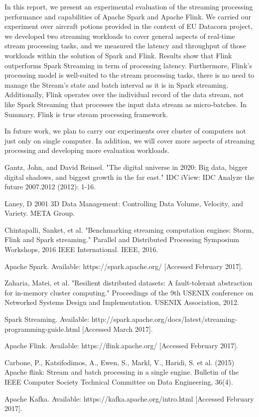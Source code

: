 \documentclass[]{article}
\begin{document}
In this report, we present an experimental evaluation of the streaming processing performance and capabilities of Apache Spark and Apache Flink. We carried our experiment over aircraft potions provided in the context of EU Datacorn  project, we developed two streaming workloads to cover general aspects of real-time stream processing tasks, and we measured the latency and throughput of those workloads within the solution of Spark and Flink. Results show that Flink outperforms Spark Streaming in term of processing latency. Furthermore, Flink's processing model is well-suited to  the stream processing tasks, there is no need to manage the Stream's state and batch interval as it is in Spark streaming. Additionally, Flink operates over the individual record of the data stream, not like Spark Streaming that processes the input data stream as micro-batches. In Summary, Flink is true stream processing framework.

In future work, we plan to carry our experiments over cluster of computers not just only on single computer. In addition, we will cover more aspects of streaming processing and developing more evaluation workloads. 




\begin{thebibliography}{[MT1]}
%
Gantz, John, and David Reinsel. "The digital universe in 2020: Big data, bigger digital shadows, and biggest growth in the far east." IDC iView: IDC Analyze the future 2007.2012 (2012): 1-16.

Laney, D 2001 3D Data Management: Controlling Data Volume, Velocity, and Variety. META Group.

Chintapalli, Sanket, et al. "Benchmarking streaming computation engines: Storm, Flink and Spark streaming." Parallel and Distributed Processing Symposium Workshops, 2016 IEEE International. IEEE, 2016.

Apache Spark. Available: https://spark.apache.org/ [Accessed February 2017].

Zaharia, Matei, et al. "Resilient distributed datasets: A fault-tolerant abstraction for in-memory cluster computing." Proceedings of the 9th USENIX conference on Networked Systems Design and Implementation. USENIX Association, 2012.

Spark Streaming. Available: http://spark.apache.org/docs/latest/streaming-programming-guide.html [Accessed March 2017].

Apache Flink. Available: https://flink.apache.org/ [Accessed February 2017].

Carbone, P., Katsifodimos, A., Ewen, S., Markl, V., Haridi, S. et al. (2015)
Apache flink: Stream and batch processing in a single engine.
Bulletin of the IEEE Computer Society Technical Committee on Data Engineering, 36(4).

Apache Kafka. Available: https://kafka.apache.org/intro.html [Accessed February 2017].

%
\end{thebibliography}
\end{document}
